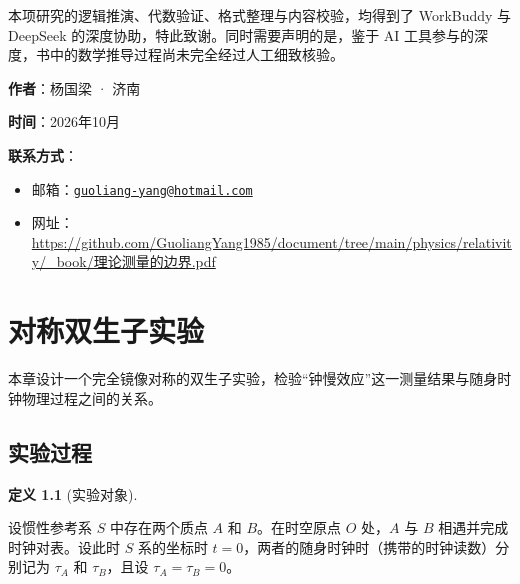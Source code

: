 \documentclass[
  chinese,
  a4paper,
  UTF8,
  12pt,
  oneside,
  openany]{ctexbook}
\theoremstyle{plain}
\theoremstyle{plain}
\theoremstyle{plain}
\theoremstyle{definition}
\newtheorem{definition}{定义}[chapter]
\theoremstyle{plain}
\theoremstyle{plain}
\theoremstyle{remark}
\begin{document}
本项研究的逻辑推演、代数验证、格式整理与内容校验，均得到了 WorkBuddy 与
DeepSeek 的深度协助，特此致谢。同时需要声明的是，鉴于 AI
工具参与的深度，书中的数学推导过程尚未完全经过人工细致核验。

\textbf{作者}：杨国梁 · 济南

\textbf{时间}：2026年10月

\textbf{联系方式}：

\begin{itemize}
\item
  邮箱：\href{mailto:guoliang-yang@hotmail.com}{\nolinkurl{guoliang-yang@hotmail.com}}
\item
  网址：\href{https://github.com/GuoliangYang1985/document/tree/main/physics/relativity/_book/理论测量的边界.pdf}{https://github.com/GuoliangYang1985/document/tree/main/physics/relativity/\_book/理论测量的边界.pdf}
\end{itemize}

\newpage

\mainmatter


\chapter{对称双生子实验}\label{sec-symmetric-twins}

本章设计一个完全镜像对称的双生子实验，检验``钟慢效应''这一测量结果与随身时钟物理过程之间的关系。

\section{实验过程}\label{ux5b9eux9a8cux8fc7ux7a0b}

\begin{definition}[实验对象]\protect\hypertarget{def-experiment-object}{}\label{def-experiment-object}

设惯性参考系 \(S\) 中存在两个质点 \(A\) 和 \(B\)。在时空原点 \(O\)
处，\(A\) 与 \(B\) 相遇并完成时钟对表。设此时 \(S\) 系的坐标时
\(t=0\)，两者的随身时钟时（携带的时钟读数）分别记为 \(\tau_{A}\) 和
\(\tau_{B}\)，且设 \(\tau_{A} = \tau_{B} = 0\)。

\end{definition}
\end{document}
